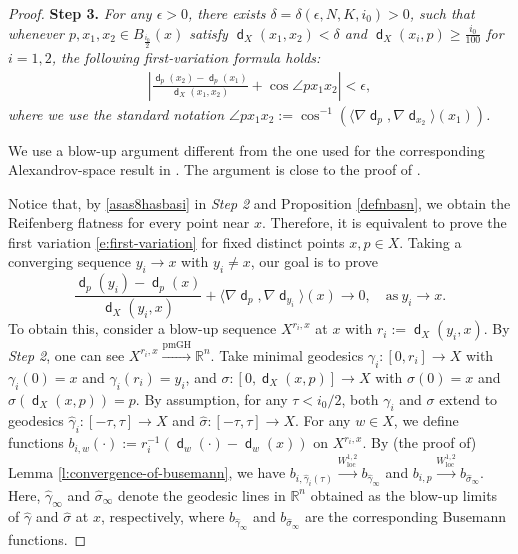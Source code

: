\documentclass[11pt,reqno]{amsart}
\theoremstyle{definition}
\numberwithin{equation}{section}
\newcommand{\dR}{\mathbb{R}}
\DeclareMathOperator{\dist}{\mathsf{d}}
\DeclareMathOperator{\loc}{loc}
\begin{document}
\begin{proof}
\smallskip



 \textbf{Step 3.} \textit{  For any $\epsilon > 0$, there exists $\delta = \delta (\epsilon, N, K, i_0) > 0$, such that whenever $p, x_1,x_2\in B_{\frac{i_0}{2}}(x)$ satisfy $\dist_X (x_1, x_2) < \delta$ and $\dist_X(x_i, p) \ge \frac{i_0}{100}$ for $i =1,2$,   the following first-variation formula holds:
 \begin{align}
     \left|  \frac{\dist_p(x_2)-\dist_p(x_1)}{\dist_X (x_1, x_2)} + \cos\angle   p   x_1 x_2  \right| < \epsilon, \label{e:first-variation} 
 \end{align}
where we use the standard notation $\angle p x_1 x_2 := \cos^{-1} (\langle \nabla \dist_p, \nabla\dist_{x_2}\rangle(x_1))$.}

\smallskip

We use a blow-up argument different from the one used for the corresponding Alexandrov-space result in \cite[Theorem 3.5]{OS}. The argument is close to the proof of \cite[Theorem 4.4]{Honda1}.


Notice that, by  \eqref{asas8hasbasi} in  \textit{Step 2} and Proposition \ref{defnbasn}, we obtain the Reifenberg flatness for every point near $x$. 
Therefore, it is equivalent to prove the first variation \eqref{e:first-variation} for fixed distinct points $x, p\in X$.
Taking a converging sequence $y_i\to x$ with $y_i \neq x$, 
our goal is to prove
\begin{equation}\label{dnssbbhss}
    \frac{\dist_p(y_i)-\dist_p(x)}{\dist_X(y_i, x)}+\langle \nabla \dist_p, \nabla \dist_{y_i}\rangle (x) \to 0, \quad \text{as}\ y_i \to x.
\end{equation}
To obtain this, consider a blow-up sequence $X^{r_i, x}$ at $x$ with $r_i:=\dist_X(y_i, x)$.
By \textit{Step 2}, one can see
$
  X^{r_i, x} \xrightarrow{\mathrm{pmGH}} \mathbb{R}^n.
$
  Take minimal geodesics $\gamma_i:[0, r_i] \to X$ with $\gamma_i (0) = x$ and $\gamma_i (r_i) = y_i$, and $\sigma: [0, \dist_X(x,p)] \to X$ with $\sigma (0) = x$ and $\sigma (\dist_X(x,p)) = p$.  By assumption, for any $\tau < i_0/2$, both $\gamma_i$ and $\sigma$ extend to geodesics 
$
 \hat{\gamma}_i: [ -\tau ,  \tau  ] \to X$    and $\hat{\sigma}: [ -\tau ,  \tau  ] \to X$. 
For any $w \in X$, we define functions
$
b_{i, w}(\cdot) := r_i^{-1} ( \dist_{w} (\cdot) - \dist_{w} (x) )$ on $X^{r_i, x}$.
By (the proof of) Lemma \ref{l:convergence-of-busemann}, we have
$b_{i, \hat{\gamma}_i(\tau)} \xrightarrow{W_{\loc}^{1,2}} b_{\hat{\gamma}_{\infty}}$ and $b_{i, p} \xrightarrow{W_{\loc}^{1,2}} b_{\hat{\sigma}_{\infty}}$. Here,  $\hat{\gamma}_{\infty}$ and $\hat{\sigma}_{\infty}$ denote the   geodesic lines in $\dR^n$ obtained as the blow-up limits of  $\hat{\gamma}$ and $\hat{\sigma}$ at $x$, respectively, where  $b_{\hat{\gamma}_{\infty}}$ and $b_{\hat{\sigma}_{\infty}}$  are the corresponding Busemann functions. 



\end{proof}
\end{document}
